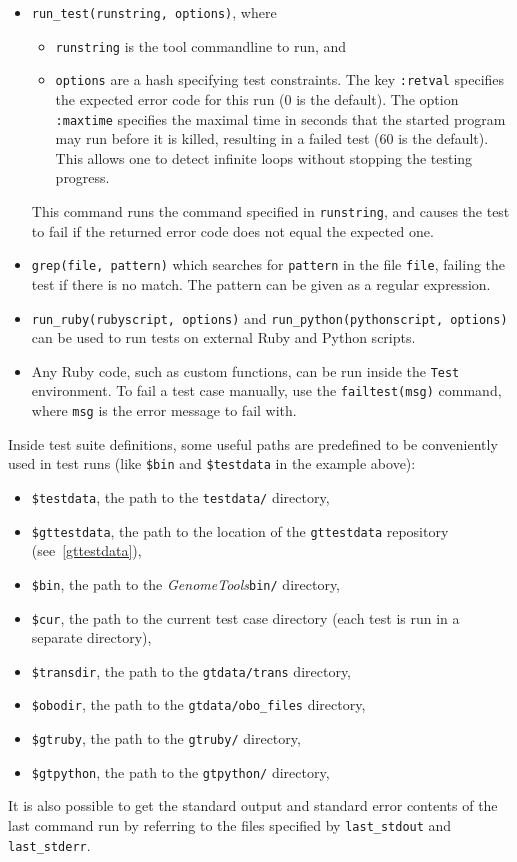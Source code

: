 \documentclass[11pt,final]{article}
\newcommand{\keyword}[1]{\lstinline{#1}}
\newcommand{\Gt}[0]{\emph{GenomeTools}\xspace}
\begin{document}
\begin{itemize}
\item
\keyword{run_test(runstring, options)}, where
\begin{itemize}
\item
\keyword{runstring} is the tool commandline to run, and
\item
\keyword{options} are a hash specifying test constraints.
The key \keyword{:retval} specifies the expected error code for this run (0 is
the default). The option \keyword{:maxtime} specifies the maximal time in
seconds that the started program may run before it is killed, resulting in a
failed test (60 is the default). This allows one to detect infinite loops
without stopping the testing progress.
\end{itemize}
This command runs the command specified in \keyword{runstring}, and causes the
test to fail if the returned error code does not equal the expected one.
\item
\keyword{grep(file, pattern)} which searches for \keyword{pattern} in the
file \keyword{file}, failing the test if there is no match. The pattern can be
given as a regular expression.
\item
\keyword{run_ruby(rubyscript, options)} and
\keyword{run_python(pythonscript, options)} can be used to run tests on
external Ruby and Python scripts.
\item
Any Ruby code, such as custom functions, can be run inside the \keyword{Test}
environment. To fail a test case manually, use the \keyword{failtest(msg)}
command, where \keyword{msg} is the error message to fail with.
\end{itemize}
Inside test suite definitions, some useful paths are predefined to be
conveniently used in test runs (like \keyword{$bin} and \keyword{$testdata} in
the example above):
\begin{itemize}
\item
\keyword{$testdata}, the path to the \keyword{testdata/} directory,
\item
\keyword{$gttestdata}, the path to the location of the \keyword{gttestdata}
repository (see~\ref{gttestdata}),
\item
\keyword{$bin}, the path to the \Gt \keyword{bin/} directory,
\item
\keyword{$cur}, the path to the current test case directory (each test is run in
a separate directory),
\item
\keyword{$transdir}, the path to the \keyword{gtdata/trans} directory,
\item
\keyword{$obodir}, the path to the \keyword{gtdata/obo_files} directory,
\item
\keyword{$gtruby}, the path to the \keyword{gtruby/} directory,
\item
\keyword{$gtpython}, the path to the \keyword{gtpython/} directory,
\end{itemize}
It is also possible to get the standard output and standard error contents of
the last command run by referring to the files specified by
\keyword{last_stdout} and \keyword{last_stderr}.
\end{document}
